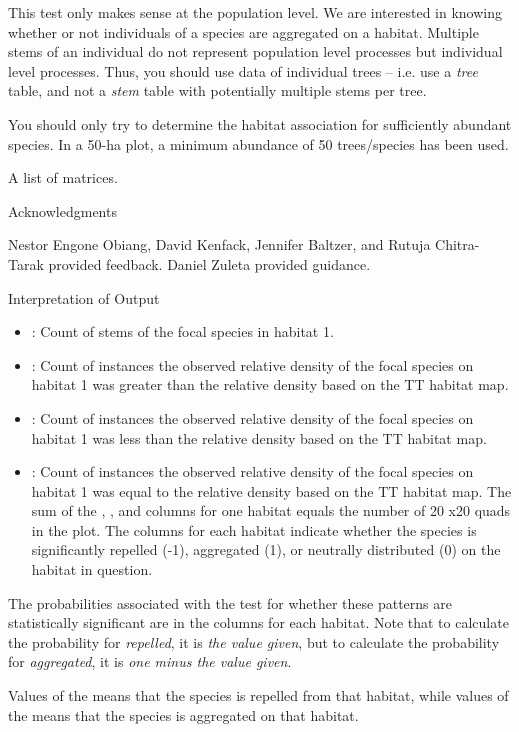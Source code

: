 \documentclass[a4paper]{book}
\begin{document}
%
\begin{Details}\relax
This test only makes sense at the population level. We are interested in
knowing whether or not individuals of a species are aggregated on a habitat.
Multiple stems of an individual do not represent population level processes
but individual level processes. Thus, you should use data of individual trees
-- i.e. use a \emph{tree} table, and not a \emph{stem} table with potentially multiple
stems per tree.

You should only try to determine the habitat association for sufficiently
abundant species. In a 50-ha plot, a minimum abundance of 50 trees/species
has been used.
\end{Details}
%
\begin{Value}
A list of matrices.
\end{Value}
%
\begin{Section}{Acknowledgments}

Nestor Engone Obiang, David Kenfack, Jennifer Baltzer, and Rutuja
Chitra-Tarak provided feedback. Daniel Zuleta provided guidance.
\end{Section}
%
\begin{Section}{Interpretation of Output}

\begin{itemize}

\item {}: Count of stems of the focal species in habitat 1.
\item {}: Count of instances the observed relative density of the focal
species on habitat 1 was greater than the relative density based on the TT
habitat map.
\item {}: Count of instances the observed relative density of the focal
species on habitat 1 was less than the relative density based on the TT
habitat map.
\item {}: Count of instances the observed relative density of the focal
species on habitat 1 was equal to the relative density based on the TT
habitat map.
The sum of the , , and  columns for one habitat
equals the number of 20 x20 quads in the plot.
The  columns for each habitat indicate whether the species is
significantly repelled (-1), aggregated (1), or neutrally distributed (0) on
the habitat in question.

\end{itemize}


The probabilities associated with the test for whether these patterns are
statistically significant are in the  columns for each habitat.
Note that to calculate the probability for \emph{repelled}, it is \emph{the value
given}, but to calculate the probability for \emph{aggregated}, it is \emph{one minus
the value given}.

Values of the  means that the species is repelled from
that habitat, while values of the  means that the
species is aggregated on that habitat.
\end{Section}
\end{document}

